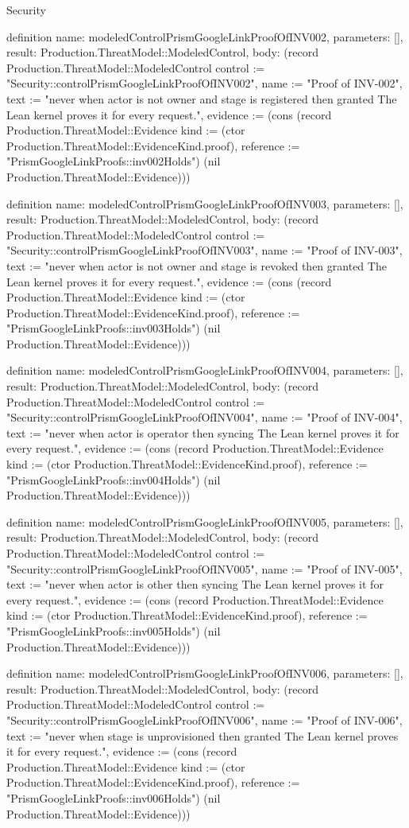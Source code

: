 \begin{lexlean}{Security}
\begin{semanticmodule}
definition{
  name: modeledControlPrismGoogleLinkProofOfINV002,
  parameters: [],
  result: Production.ThreatModel::ModeledControl,
  body: (record Production.ThreatModel::ModeledControl {control := "Security::controlPrismGoogleLinkProofOfINV002", name := "Proof of INV-002", text := "never when actor is not owner and stage is registered then granted The Lean kernel proves it for every request.", evidence := (cons (record Production.ThreatModel::Evidence {kind := (ctor Production.ThreatModel::EvidenceKind.proof), reference := "PrismGoogleLinkProofs::inv002Holds"}) (nil Production.ThreatModel::Evidence))})
}

definition{
  name: modeledControlPrismGoogleLinkProofOfINV003,
  parameters: [],
  result: Production.ThreatModel::ModeledControl,
  body: (record Production.ThreatModel::ModeledControl {control := "Security::controlPrismGoogleLinkProofOfINV003", name := "Proof of INV-003", text := "never when actor is not owner and stage is revoked then granted The Lean kernel proves it for every request.", evidence := (cons (record Production.ThreatModel::Evidence {kind := (ctor Production.ThreatModel::EvidenceKind.proof), reference := "PrismGoogleLinkProofs::inv003Holds"}) (nil Production.ThreatModel::Evidence))})
}

definition{
  name: modeledControlPrismGoogleLinkProofOfINV004,
  parameters: [],
  result: Production.ThreatModel::ModeledControl,
  body: (record Production.ThreatModel::ModeledControl {control := "Security::controlPrismGoogleLinkProofOfINV004", name := "Proof of INV-004", text := "never when actor is operator then syncing The Lean kernel proves it for every request.", evidence := (cons (record Production.ThreatModel::Evidence {kind := (ctor Production.ThreatModel::EvidenceKind.proof), reference := "PrismGoogleLinkProofs::inv004Holds"}) (nil Production.ThreatModel::Evidence))})
}

definition{
  name: modeledControlPrismGoogleLinkProofOfINV005,
  parameters: [],
  result: Production.ThreatModel::ModeledControl,
  body: (record Production.ThreatModel::ModeledControl {control := "Security::controlPrismGoogleLinkProofOfINV005", name := "Proof of INV-005", text := "never when actor is other then syncing The Lean kernel proves it for every request.", evidence := (cons (record Production.ThreatModel::Evidence {kind := (ctor Production.ThreatModel::EvidenceKind.proof), reference := "PrismGoogleLinkProofs::inv005Holds"}) (nil Production.ThreatModel::Evidence))})
}

definition{
  name: modeledControlPrismGoogleLinkProofOfINV006,
  parameters: [],
  result: Production.ThreatModel::ModeledControl,
  body: (record Production.ThreatModel::ModeledControl {control := "Security::controlPrismGoogleLinkProofOfINV006", name := "Proof of INV-006", text := "never when stage is unprovisioned then granted The Lean kernel proves it for every request.", evidence := (cons (record Production.ThreatModel::Evidence {kind := (ctor Production.ThreatModel::EvidenceKind.proof), reference := "PrismGoogleLinkProofs::inv006Holds"}) (nil Production.ThreatModel::Evidence))})
}


\end{semanticmodule}
\end{lexlean}
